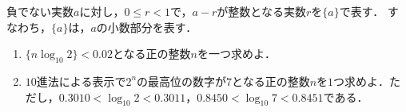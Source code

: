 \documentclass[../../main.tex]{subfiles}
\begin{document}
負でない実数$a$に対し，$0\le r<1$で，$a-r$が整数となる実数$r$を$\{a\}$で表す．
すなわち，$\{a\}$は，$a$の小数部分を表す．
\begin{enumerate}
  \item $\{n\log_{10} 2\}<0.02$となる正の整数$n$を一つ求めよ．
  \item $10$進法による表示で$2^n$の最高位の数字が$7$となる正の整数$n$を$1$つ求めよ．ただし，$0.3010<\log_{10}2<0.3011$，$0.8450<\log_{10}7<0.8451$である．
\end{enumerate}
\end{document}
